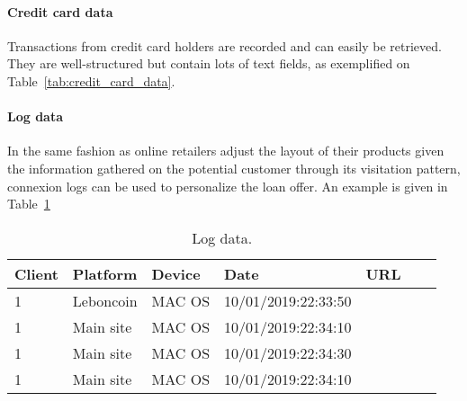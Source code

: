 \paragraph{Credit card data}

Transactions from credit card holders are recorded and can easily be retrieved. They are well-structured but contain lots of text fields, as exemplified on Table~\ref{tab:credit_card_data}.

\begin{table}[ht]
    \centering
    \caption{Daily per-client credit card data.}
    \label{tab:credit_card_data}
\begin{tiny}
\end{tiny}
\end{table}


\paragraph{Log data}

In the same fashion as online retailers adjust the layout of their products given the information gathered on the potential customer through its visitation pattern, connexion logs can be used to personalize the loan offer. An example is given in Table~\ref{tab:log_data}

\begin{table}[ht]
    \centering
    \caption{Log data.}
    \label{tab:log_data}
    \begin{small}
\begin{tabular}{lllllll}
Client & Platform & Device & Date & URL \\
 \hline
1 & Leboncoin & MAC OS & 10/01/2019:22:33:50 &  \\
1 & Main site & MAC OS & 10/01/2019:22:34:10 &  \\
1 & Main site & MAC OS & 10/01/2019:22:34:30 &  \\
1 & Main site & MAC OS & 10/01/2019:22:34:10 &  \\
\end{tabular}
    \end{small}
\end{table}





